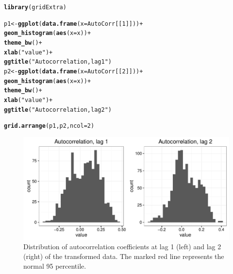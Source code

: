 \documentclass[a4paper,11pt,fleqn,twoside,notitlepage]{report}
\makeatletter
\def\maxwidth{ %
  \ifdim\Gin@nat@width>\linewidth
    \linewidth
  \else
    \Gin@nat@width
  \fi
}
\newcommand{\hlnum}[1]{\textcolor[rgb]{0.686,0.059,0.569}{#1}}%
\newcommand{\hlstr}[1]{\textcolor[rgb]{0.192,0.494,0.8}{#1}}%
\newcommand{\hlopt}[1]{\textcolor[rgb]{0,0,0}{#1}}%
\newcommand{\hlstd}[1]{\textcolor[rgb]{0.345,0.345,0.345}{#1}}%
\newcommand{\hlkwb}[1]{\textcolor[rgb]{0.69,0.353,0.396}{#1}}%
\newcommand{\hlkwc}[1]{\textcolor[rgb]{0.333,0.667,0.333}{#1}}%
\newcommand{\hlkwd}[1]{\textcolor[rgb]{0.737,0.353,0.396}{\textbf{#1}}}%
\newenvironment{kframe}{%
 \def\at@end@of@kframe{}%
 \ifinner\ifhmode%
  \def\at@end@of@kframe{\end{minipage}}%
  \begin{minipage}{\columnwidth}%
 \fi\fi%
 \def\FrameCommand##1{\hskip\@totalleftmargin \hskip-\fboxsep
 \colorbox{shadecolor}{##1}\hskip-\fboxsep
     \hskip-\linewidth \hskip-\@totalleftmargin \hskip\columnwidth}%
 \MakeFramed {\advance\hsize-\width
   \@totalleftmargin\z@ \linewidth\hsize
   \@setminipage}}%
 {\par\unskip\endMakeFramed%
 \at@end@of@kframe}
\newenvironment{knitrout}{}{} %
\makeatother
\begin{document}
\begin{kframe}\begin{alltt}
\hlkwd{library}\hlstd{(gridExtra)}

\hlstd{p1}\hlkwb{<-} \hlkwd{ggplot}\hlstd{(}\hlkwd{data.frame}\hlstd{(}\hlkwc{x}\hlstd{=AutoCorr[[}\hlnum{1}\hlstd{]]))} \hlopt{+}
  \hlkwd{geom_histogram}\hlstd{(}\hlkwd{aes}\hlstd{(}\hlkwc{x}\hlstd{=x))} \hlopt{+}
  \hlkwd{theme_bw}\hlstd{()} \hlopt{+}
  \hlkwd{xlab}\hlstd{(}\hlstr{"value"}\hlstd{)} \hlopt{+}
  \hlkwd{ggtitle}\hlstd{(}\hlstr{"Autocorrelation, lag 1"}\hlstd{)}
\hlstd{p2} \hlkwb{<-} \hlkwd{ggplot}\hlstd{(}\hlkwd{data.frame}\hlstd{(}\hlkwc{x}\hlstd{=AutoCorr[[}\hlnum{2}\hlstd{]]))} \hlopt{+}
  \hlkwd{geom_histogram}\hlstd{(}\hlkwd{aes}\hlstd{(}\hlkwc{x}\hlstd{=x))} \hlopt{+}
  \hlkwd{theme_bw}\hlstd{()} \hlopt{+}
  \hlkwd{xlab}\hlstd{(}\hlstr{"value"}\hlstd{)} \hlopt{+}
  \hlkwd{ggtitle}\hlstd{(}\hlstr{"Autocorrelation, lag 2"}\hlstd{)}
\end{alltt}
\end{kframe}
\begin{center}
\begin{knitrout}
\color{fgcolor}\begin{kframe}
\begin{alltt}
\hlkwd{grid.arrange}\hlstd{(p1,p2,} \hlkwc{ncol}\hlstd{=}\hlnum{2}\hlstd{)}
\end{alltt}


{\ttfamily\noindent\itshape\color{messagecolor}{\#\# `stat\_bin()` using `bins = 30`. Pick better value with `binwidth`.\\\#\# `stat\_bin()` using `bins = 30`. Pick better value with `binwidth`.}}\end{kframe}\begin{figure}
\includegraphics[width=\maxwidth]{figure/FigureACF-1} \caption[Distribution of autocorrelation coefficients at lag 1 (left) and lag 2 (right) of the transformed data]{Distribution of autocorrelation coefficients at lag 1 (left) and lag 2 (right) of the transformed data. The marked red line represents the normal 95 percentile.}\label{fig:FigureACF}
\end{figure}


\end{knitrout}
\end{center}
\end{document}
